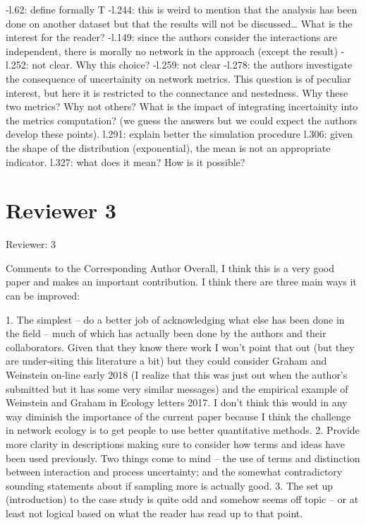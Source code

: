 \documentclass[12pt]{letter}
\begin{document}
	-l.62: define formally T
	-l.244: this is weird to mention that the analysis has been done on another dataset but that the results will not be discussed… What is the interest for the reader?
	-l.149: since the authors consider the interactions are independent, there is morally no network in the approach (except the result)
	-l.252: not clear. Why this choice?
	-l.259: not clear
	-l.278: the authors investigate the consequence of uncertainity on network metrics. This question is of peculiar interest, but here it is restricted to the connectance and nestedness. Why these two metrics? Why not others? What is the impact of integrating incertainity into the metrics computation? (we guess the answers but we could expect the authors develop these points).
	l.291: explain better the simulation procedure
	l.306: given the shape of the distribution (exponential), the mean is not an appropriate indicator.
	l.327: what does it mean? How is it possible?

\section*{Reviewer 3}

Reviewer: 3

Comments to the Corresponding Author
Overall, I think this is a very good paper and makes an important contribution.  I think there are three main ways it can be improved:

1.      The simplest – do a better job of acknowledging what else has been done in the field – much of which has actually been done by the authors and their collaborators.  Given that they know there work I won’t point that out (but they are under-siting this literature a bit) but they could consider Graham and Weinstein on-line early 2018 (I realize that this was just out when the author’s submitted but it has some very similar messages) and the empirical example of Weinstein and Graham in Ecology letters 2017.  I don’t think this would in any way diminish the importance of the current paper because I think the challenge in network ecology is to get people to use better quantitative methods.
2.      Provide more clarity in descriptions making sure to consider how terms and ideas have been used previously.  Two things come to mind – the use of terms and distinction between interaction and process uncertainty; and the somewhat contradictory sounding statements about if sampling more is actually good.
3.      The set up (introduction) to the case study is quite odd and somehow seems off topic – or at least not logical based on what the reader has read up to that point.
\end{document}
